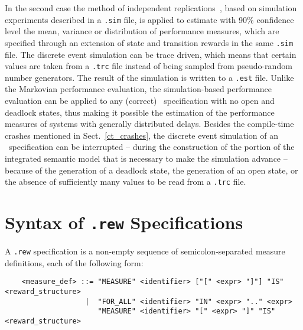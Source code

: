 In the second case the method of independent replications~\cite{Wel}, based on simulation experiments
described in a {\tt .sim} file, is applied to estimate with 90\% confidence level the mean, variance or
distribution of performance measures, which are specified through an extension of state and transition
rewards in the same {\tt .sim} file. The discrete event simulation can be trace driven, which means that
certain values are taken from a {\tt .trc} file instead of being sampled from pseudo-random number
generators. The result of the simulation is written to a {\tt .est} file. Unlike the Markovian performance
evaluation, the simulation-based performance evaluation can be applied to any (correct) \aemilia\
specification with no open and deadlock states, thus making it possible the estimation of the performance
measures of systems with generally distributed delays. Besides the compile-time crashes mentioned in
Sect.~\ref{ct_crashes}, the discrete event simulation of an \aemilia\ specification can be interrupted --
during the construction of the portion of the integrated semantic model that is necessary to make the
simulation advance -- because of the generation of a deadlock state, the generation of an open state, or the
absence of sufficiently many values to be read from a {\tt .trc} file.



\section{Syntax of {\tt .rew} Specifications}

A {\tt .rew} specification is a non-empty sequence of semicolon-separated measure definitions, each of the
following form:

        \begin{verbatim}
    <measure_def> ::= "MEASURE" <identifier> ["[" <expr> "]"] "IS" <reward_structure>
                   |  "FOR_ALL" <identifier> "IN" <expr> ".." <expr>
                      "MEASURE" <identifier> "[" <expr> "]" "IS" <reward_structure>
        \end{verbatim}

